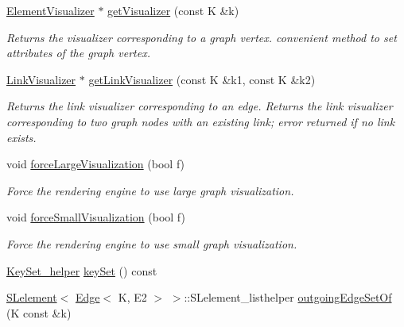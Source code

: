 \begin{DoxyCompactItemize}
\item 
\hyperlink{classbridges_1_1datastructure_1_1_element_visualizer}{Element\+Visualizer} $\ast$ \hyperlink{classbridges_1_1datastructure_1_1_graph_adj_list_a097e4678b1273c29b1ac63319b4535e5}{get\+Visualizer} (const K \&k)
\begin{DoxyCompactList}\small\item\em Returns the visualizer corresponding to a graph vertex. convenient method to set attributes of the graph vertex. \end{DoxyCompactList}\item 
\hyperlink{classbridges_1_1datastructure_1_1_link_visualizer}{Link\+Visualizer} $\ast$ \hyperlink{classbridges_1_1datastructure_1_1_graph_adj_list_ae36ba10fae403339df0c36707ed13536}{get\+Link\+Visualizer} (const K \&k1, const K \&k2)
\begin{DoxyCompactList}\small\item\em Returns the link visualizer corresponding to an edge. Returns the link visualizer corresponding to two graph nodes with an existing link; error returned if no link exists. \end{DoxyCompactList}\item 
void \hyperlink{classbridges_1_1datastructure_1_1_graph_adj_list_a6860a0a153fd126ebe8b1bc40d2753a7}{force\+Large\+Visualization} (bool f)
\begin{DoxyCompactList}\small\item\em Force the rendering engine to use large graph visualization. \end{DoxyCompactList}\item 
void \hyperlink{classbridges_1_1datastructure_1_1_graph_adj_list_a9706e3df7d30320b7e7773a6423e4ff7}{force\+Small\+Visualization} (bool f)
\begin{DoxyCompactList}\small\item\em Force the rendering engine to use small graph visualization. \end{DoxyCompactList}\item 
\hyperlink{classbridges_1_1datastructure_1_1_graph_adj_list_1_1_key_set__helper}{Key\+Set\+\_\+helper} \hyperlink{classbridges_1_1datastructure_1_1_graph_adj_list_a0562e8d82499f26ad656a1dfb5f8908e}{key\+Set} () const
\item 
\hyperlink{classbridges_1_1datastructure_1_1_s_lelement}{S\+Lelement}$<$ \hyperlink{classbridges_1_1datastructure_1_1_edge}{Edge}$<$ K, E2 $>$ $>$\+::S\+Lelement\+\_\+listhelper \hyperlink{classbridges_1_1datastructure_1_1_graph_adj_list_ac066da800ab88dc2e55a89650e08bb78}{outgoing\+Edge\+Set\+Of} (K const \&k)

\end{DoxyCompactItemize}
